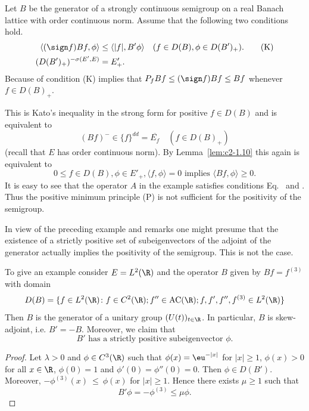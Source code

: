 \begin{remark}\label{rem:c2-3.16}
Let $B$ be the generator of a strongly continuous semigroup on a real Banach lattice with order continuous norm. Assume that the following two conditions hold.
\begin{align}
\langle(\sign  f)Bf,\phi\rangle &\leq \langle|f|,B'\phi\rangle \quad (f \in D(B),  \phi \in D(B')_{+}). \label{eq:c2-3.17-K} \tag{K}\\
(D(B')_{+})^{-\sigma(E',E)} &= E'_{+}. \label{eq:c2-3.17}
\end{align}
Because of  condition (K) implies that $P_{f}Bf \leq (\sign  f)Bf \leq Bf$
whenever $f \in D(B)_{+}$.

This is Kato's inequality in the strong form for positive $f \in D(B)$ and is equivalent to 
\[
(Bf)^{-} \in \{f\}^{dd} = \overline{E_f} \quad (f \in D(B)_{+})
\]
(recall that $E$ has order continuous norm). By Lemma~\ref{lem:c2-1.10}  this again is equivalent to
\begin{equation}\label{eq:c2-P2} \tag{P}
0 \leq f \in D(B),  \phi \in E'_{+},  \langle f,\phi \rangle = 0 \text{ implies } \langle Bf,\phi \rangle \geq 0.
\end{equation}
It is easy to see that the operator $A$ in the example satisfies conditions Eq.~  and . Thus the positive minimum principle (P) is not sufficient for the positivity of the semigroup.
\end{remark}
In view of the preceding example and remarks one might presume that the existence of a strictly positive set of subeigenvectors of the adjoint of the generator actually implies the positivity of the semigroup. 
This is not the case.

To give an example consider $E = L^{2}(\R)$ and the operator $B$ given by 
$Bf = f^{(3)}$ with domain
\[
D(B) = \{f \in L^{2}(\R) \colon f \in C^{2}(\R); f'' \in \text{AC}(\R) ; f,f',f'',f^{(3)} \in L^{2}(\R)\}
\]
Then $B$ is the generator of a unitary group $(U(t))_{t \in \R}$. 
In particular, $B$ is skew-adjoint, i.e. $B' = -B$.
Moreover, we claim that
\begin{equation}\label{eq:c2-3.18}
B' \text{ has a strictly positive subeigenvector } \phi.
\end{equation}
\begin{proof}
Let $\lambda > 0$ and $\phi \in C^{3}(\R)$ such that $\phi(x) = \eu^{-|x|}$ for
$|x| \geq 1$, $\phi(x) > 0$ for all $x \in \R$, $\phi(0) = 1$ and $\phi'(0) = \phi''(0) = 0$.
Then $\phi \in D(B')$. 
Moreover, $-\phi^{(3)}(x)~\leq~\phi(x)$ for $|x| \geq 1$. 
Hence there exists $\mu \geq 1$ such that
%
\[
	B'\phi = -\phi^{(3)} \leq \mu\phi.
\]
%
\phantom{x}
\end{proof}

